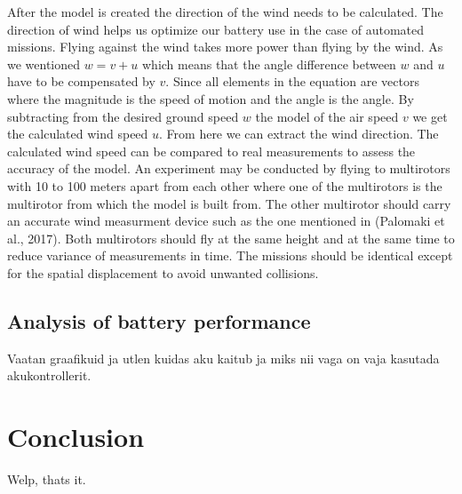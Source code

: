 \documentclass[12pt,oneside]{reedthesis}
\theoremstyle{definition}
\theoremstyle{definition}
\theoremstyle{definition}
\theoremstyle{remark}
\begin{document}
After the model is created the direction of the wind needs to be
calculated. The direction of wind helps us optimize our battery use in
the case of automated missions. Flying against the wind takes more power
than flying by the wind. As we wentioned \(w = v + u\) which means that
the angle difference between \(w\) and \(u\) have to be compensated by
\(v\). Since all elements in the equation are vectors where the
magnitude is the speed of motion and the angle is the angle. By
subtracting from the desired ground speed \(w\) the model of the air
speed \(v\) we get the calculated wind speed \(u\). From here we can
extract the wind direction. The calculated wind speed can be compared to
real measurements to assess the accuracy of the model. An experiment may
be conducted by flying to multirotors with 10 to 100 meters apart from
each other where one of the multirotors is the multirotor from which the
model is built from. The other multirotor should carry an accurate wind
measurment device such as the one mentioned in (Palomaki et al., 2017).
Both multirotors should fly at the same height and at the same time to
reduce variance of measurements in time. The missions should be
identical except for the spatial displacement to avoid unwanted
collisions.

\hypertarget{analysis-of-battery-performance}{\section{Analysis of
battery performance}\label{analysis-of-battery-performance}}

Vaatan graafikuid ja utlen kuidas aku kaitub ja miks nii vaga on vaja
kasutada akukontrollerit.

\chapter*{Conclusion}\label{conclusion}

Welp, thats it.

\appendix
\end{document}
